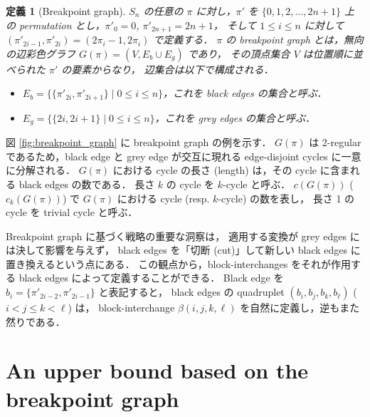 \documentclass[paper=a4,fontsize=11pt,report,oneside]{jlreq}
\newtheorem{definition}[theorem]{定義}
\begin{document}
\begin{definition}[Breakpoint graph] \cite{hannenhalli1999transforming}
    $S_n$ の任意の $\pi$ に対し，$\pi'$ を $\{0, 1, 2, \dots, 2n+1\}$ 上の
    permutation とし，$\pi'_0 = 0$, $\pi'_{2n+1} = 2n + 1$，
    そして $1 \le i \le n$ に対して $(\pi'_{2i-1}, \pi'_{2i}) = (2\pi_i - 1, 2\pi_i)$
    で定義する．
    $\pi$ の breakpoint graph とは，無向の辺彩色グラフ $G(\pi) = (V, E_b \cup E_g)$ であり，
    その頂点集合 $V$ は位置順に並べられた $\pi'$ の要素からなり，
    辺集合は以下で構成される．
    \begin{itemize}
        \item $E_b = \{\{\pi'_{2i}, \pi'_{2i+1}\} \mid 0 \le i \le n\}$，これを black edges の集合と呼ぶ．
        \item $E_g = \{\{2i, 2i + 1\} \mid 0 \le i \le n\}$，これを grey edges の集合と呼ぶ．
    \end{itemize}
\end{definition}

図 \ref{fig:breakpoint_graph} に breakpoint graph の例を示す．
$G(\pi)$ は 2-regular であるため，black edge と grey edge が交互に現れる
edge-disjoint cycles に一意に分解される．
$G(\pi)$ における cycle の長さ (length) は，その cycle に含まれる black edges の数である．
長さ $k$ の cycle を $k$-cycle と呼ぶ．
$c(G(\pi))$ ($c_k(G(\pi))$) で $G(\pi)$ における cycle (resp. $k$-cycle) の数を表し，
長さ 1 の cycle を trivial cycle と呼ぶ．

Breakpoint graph に基づく戦略の重要な洞察は，
適用する変換が grey edges には決して影響を与えず，
black edges を「切断 (cut)」して新しい black edges に置き換えるという点にある．
この観点から，block-interchanges をそれが作用する black edges によって定義することができる．
Black edge を $b_i = \{\pi'_{2i-2}, \pi'_{2i-1}\}$ と表記すると，
black edges の quadruplet $(b_i, b_j, b_k, b_\ell)$ ($i < j \le k < \ell$) は，
block-interchange $\beta(i, j, k, \ell)$ を自然に定義し，逆もまた然りである．


\section{An upper bound based on the breakpoint graph}
\end{document}
